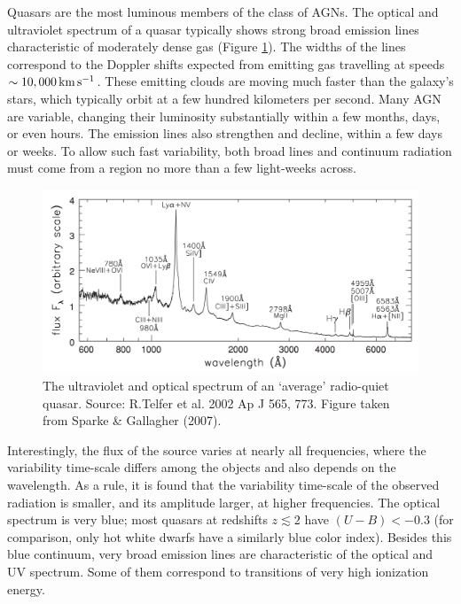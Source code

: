 \documentclass[a4paper,11pt]{article}
\begin{document}
{\noindent}Quasars are the most luminous members of the class of AGNs. The optical and ultraviolet spectrum of a quasar typically shows strong broad emission lines characteristic of moderately dense gas (Figure \ref{fig:qsoradioquiet}). The widths of the lines correspond to the Doppler shifts expected from emitting gas travelling at speeds $\sim10,000\,{\rm km\,s^{-1}}$. These emitting clouds are moving much faster than the galaxy's stars, which typically orbit at a few hundred kilometers per second. Many AGN are variable, changing their luminosity substantially within a few months, days, or even hours. The emission lines also strengthen and decline, within a few days or weeks. To allow such fast variability, both broad lines and continuum radiation must come from a region no more than a few light-weeks across.

\begin{figure}[h]
    \centering
    \includegraphics[width=16cm]{figures/QSO_radioquiet.png}
    \caption{\footnotesize{The ultraviolet and optical spectrum of an `average' radio-quiet quasar. Source: R.Telfer et al. 2002 Ap J 565, 773. Figure taken from Sparke \& Gallagher (2007).}}
    \label{fig:qsoradioquiet}
\end{figure}

{\noindent}Interestingly, the flux of the source varies at nearly all frequencies, where the variability time-scale differs among the objects and also depends on the wavelength. As a rule, it is found that the variability time-scale of the observed radiation is smaller, and its amplitude larger, at higher frequencies. The optical spectrum is very blue; most quasars at redshifts $z\lesssim2$ have $(U-B)<-0.3$ (for comparison, only hot white dwarfs have a similarly blue color index). Besides this blue continuum, very broad emission lines are characteristic of the optical and UV spectrum. Some of them correspond to transitions of very high ionization energy.
\end{document}
